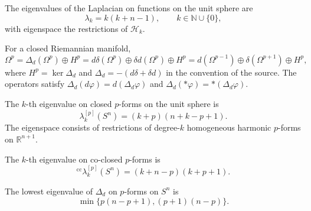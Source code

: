 \begin{proposition}
\label{prop:chow-iv-k20-function-spectrum-sphere}
The eigenvalues of the Laplacian on functions on the unit sphere are
\[
\lambda_k=k(k+n-1),\qquad k\in\mathbb N\cup\{0\},
\]
with eigenspace the restrictions of $\mathcal H_k$.
\end{proposition}

\begin{theorem}
\label{thm:chow-iv-k21-hodge-decomposition}
For a closed Riemannian manifold,
\[
\Omega^p=\Delta_d(\Omega^p)\oplus H^p
=d\delta(\Omega^p)\oplus\delta d(\Omega^p)\oplus H^p
=d(\Omega^{p-1})\oplus\delta(\Omega^{p+1})\oplus H^p,
\]
where $H^p=\ker\Delta_d$ and $\Delta_d=-(d\delta+\delta d)$ in the
convention of the source.  The operators satisfy
$\Delta_d(d\varphi)=d(\Delta_d\varphi)$ and
$\Delta_d(*\varphi)=*(\Delta_d\varphi)$.
\end{theorem}

\begin{theorem}
\label{thm:chow-iv-k22-closed-eigenforms}
The $k$-th eigenvalue on closed $p$-forms on the unit sphere is
\[
\lambda_k^{[p]}(S^n)=(k+p)(n+k-p+1).
\]
The eigenspace consists of restrictions of degree-$k$ homogeneous harmonic
$p$-forms on $\mathbb R^{n+1}$.
\end{theorem}

\begin{theorem}
\label{thm:chow-iv-k23-coclosed-eigenforms}
The $k$-th eigenvalue on co-closed $p$-forms is
\[
{}^{\mathrm{cc}}\lambda_k^{[p]}(S^n)=(k+n-p)(k+p+1).
\]
\end{theorem}

\begin{corollary}
\label{cor:chow-iv-k24-lowest-p-form-eigenvalue}
The lowest eigenvalue of $\Delta_d$ on $p$-forms on $S^n$ is
\[
\min\{p(n-p+1),(p+1)(n-p)\}.
\]
\end{corollary}

